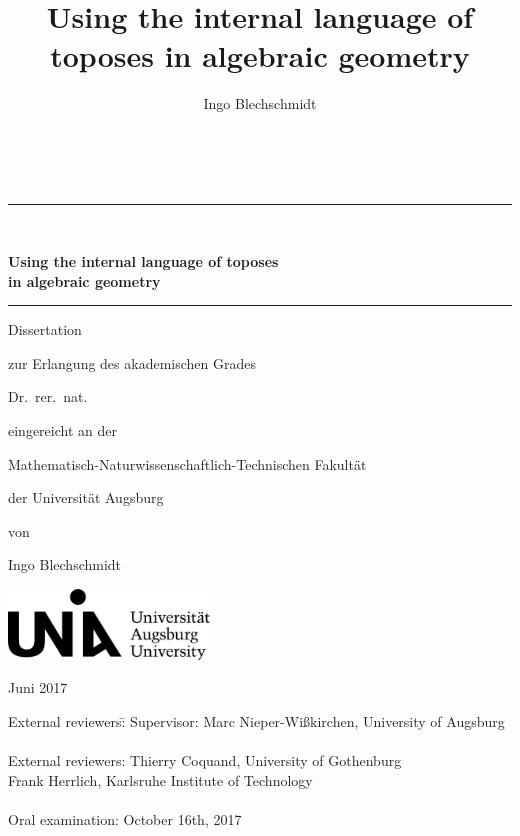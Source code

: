 \documentclass[10pt,reqno,a4paper]{amsbook}
\title{Using the internal language of toposes in algebraic geometry}
\author{Ingo Blechschmidt}
\theoremstyle{definition}
\theoremstyle{plain}
\theoremstyle{remark}
\newcommand{\?}{\,{:}\,}
\renewcommand{\_}{\mathpunct{.}\,}
\begin{document}
\newcommand{\HRule}{\rule{\linewidth}{.6pt}}

\begin{center}
\thispagestyle{empty}

\
\bigskip\bigskip

\HRule \\[0.4cm]
{\huge \bfseries Using the internal language of toposes \\ in algebraic geometry\par}\vspace{0.4cm}
\HRule

\bigskip\bigskip\bigskip\bigskip

\Large

Dissertation
\smallskip

zur Erlangung des akademischen Grades
\bigskip\bigskip

Dr.~rer.~nat.
\bigskip\bigskip

eingereicht an der
\bigskip\bigskip

Mathematisch-Naturwissenschaftlich-Technischen Fakultät
\smallskip

der Universität Augsburg
\bigskip\bigskip

von
\bigskip\bigskip

{\large Ingo Blechschmidt}
\bigskip\bigskip

\bigskip\bigskip
\bigskip\bigskip
\bigskip\bigskip
\bigskip\bigskip
\bigskip\bigskip
\bigskip\bigskip

\includegraphics[width=0.4\textwidth]{images/logo-uni-augsburg}

\bigskip\bigskip
\bigskip\bigskip

Juni 2017

\end{center}


\newpage

\vspace*{54em}

\begin{tabbing}
  External reviewers:\quad \= \kill
  Supervisor: \> Marc Nieper-Wißkirchen, University of Augsburg \\
  \\
  External reviewers: \> Thierry Coquand, University of Gothenburg \\
  \> Frank Herrlich, Karlsruhe Institute of Technology \\
  \\
  Oral examination: \> October 16th, 2017
\end{tabbing}
\end{document}
